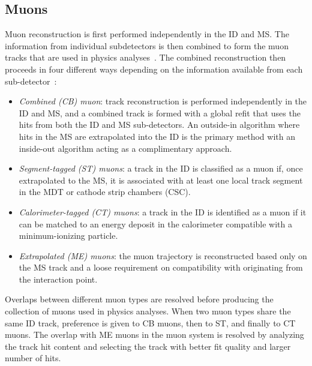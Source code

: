 \subsection{Muons}
Muon reconstruction is first performed independently in the ID and MS. 
The information from individual subdetectors is then combined to form the muon tracks that are used in physics analyses~\cite{ATLAS:2016lqx}.
The combined reconstruction then proceeds in four different ways depending on the information available from each sub-detector~\cite{ATLAS:2016lqx}:
\begin{itemize}
    \item \emph{Combined (CB) muon}: track reconstruction is performed independently in the ID and MS, and a combined track is formed with a global refit that uses the hits from both the ID and MS sub-detectors.
    An outside-in algorithm where hits in the MS are extrapolated into the ID is the primary method with an inside-out algorithm acting as a complimentary approach.
    \item \emph{Segment-tagged (ST) muons}: a track in the ID is classified as a muon if, once extrapolated to the MS, it is associated with at least one local track segment in the MDT or cathode strip chambers (CSC).
    \item \emph{Calorimeter-tagged (CT) muons}: a track in the ID is identified as a muon if it can be matched to an energy deposit in the calorimeter compatible with a minimum-ionizing particle.
    \item \emph{Extrapolated (ME) muons}: the muon trajectory is reconstructed based only on the MS track and a loose requirement on compatibility with originating from the interaction point.
\end{itemize}
Overlaps between different muon types are resolved before producing the collection of muons used in physics analyses.
When two muon types share the same ID track, preference is given to CB muons, then to ST, and finally to CT muons. The overlap with ME muons in the muon system is resolved by analyzing the track hit content and selecting the track with better fit quality and larger number of hits\cite{ATLAS:2016lqx}.


